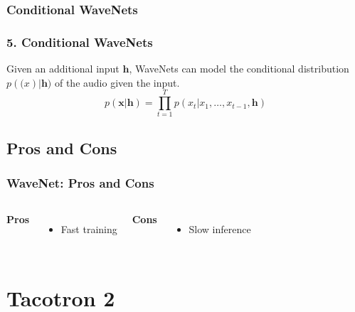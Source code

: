 \documentclass{beamer}
\begin{document}
  \subsubsection{Conditional WaveNets}
  \begin{frame}
    \frametitle{5. Conditional WaveNets}
    Given an additional input $\mathbf{h}$, WaveNets can model the conditional distribution $p(\mathbf(x)|\mathbf{h})$ of the audio given the input.
    \begin{equation*}
      p(\mathbf{x} | \mathbf{h}) = \prod_{t=1}^{T}p(x_t | x_1, \ldots, x_{t-1}, \mathbf{h}) 
    \end{equation*}
  \end{frame}

  \subsection{Pros and Cons}
  \begin{frame}
    \frametitle{WaveNet: Pros and Cons}
    \begin{columns}
        \textbf{Pros}
        \begin{itemize}
          \item Fast training
        \end{itemize}
        \textbf{Cons}
        \begin{itemize}
          \item Slow inference
        \end{itemize}
    \end{columns}
  \end{frame}

  \section{Tacotron 2}
\end{document}
